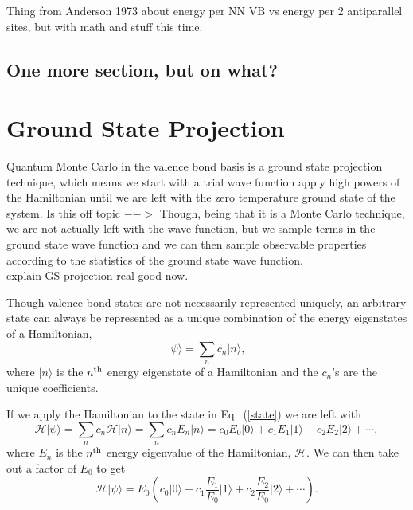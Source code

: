 {\color{red} Thing from Anderson 1973 about energy per NN VB vs energy per 2 antiparallel sites,
but with math and stuff this time.}

\subsection{One more section, but on what?}


\section{Ground State Projection}

Quantum Monte Carlo in the valence bond basis is a ground state projection technique, 
which means we start with a trial wave function apply high powers of the Hamiltonian until 
we are left with the zero temperature ground state of the system.  {\color{red} Is this off topic $-->$}
Though, being that it is a
Monte Carlo technique, we are not actually left with the wave function, but we sample terms in
the ground state wave function and we can then sample observable properties
 according to the statistics of the 
ground state wave function.\\
{\color{red} explain GS projection real good now.}

Though valence bond states are not necessarily represented uniquely, an arbitrary state can 
always be represented as a unique combination of the energy eigenstates of a Hamiltonian,
\begin{equation}
\lvert \psi \rangle = \sum_n c_n \lvert n \rangle,
\label{state}
\end{equation}
where $\lvert n \rangle$ is the $n^{\rm{th}}$ energy eigenstate of a Hamiltonian and the 
$c_n$\!'s are
the unique coefficients.

If we apply the Hamiltonian to the state in Eq.~(\ref{state}) we are left with
\begin{equation}
\mathcal{H}\lvert \psi \rangle = \sum_n c_n \mathcal{H} \lvert n \rangle =
 		\sum_n c_n E_n \lvert n \rangle = 
		c_0 E_0 \lvert 0 \rangle + c_1 E_1 \lvert 1 \rangle +
		c_2 E_2 \lvert 2 \rangle + \cdots,
\end{equation}
where $E_n$ is the $n^{\rm{th}}$ energy eigenvalue of the Hamiltonian, $\mathcal{H}$.
We can then take out a factor of $E_0$ to get
\begin{equation}
\mathcal{H}\lvert \psi \rangle =
		E_0 \left(c_0 \lvert 0 \rangle + c_1 \frac{E_1}{E_0} \lvert 1 \rangle +
		c_2\frac{ E_2}{E_0} \lvert 2 \rangle + \cdots \right).
\end{equation}

